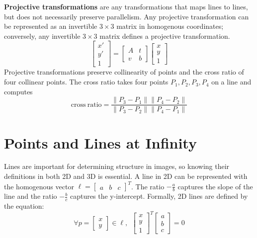 \documentclass[a4paper, 12pt]{article}
\renewcommand\emph{\textbf}
\begin{document}
\emph{Projective transformations} are any transformations that maps lines to lines, but does not necessarily preserve parallelism. Any projective transformation can be represented as an invertible $3\times 3$ matrix in homogenous coordinates; conversely, any invertible $3\times 3$ matrix defines a projective transformation.
\begin{equation*}
    \begin{bmatrix}x'\\y'\\1\end{bmatrix} = \begin{bmatrix}A & t\\ v & b\end{bmatrix}\begin{bmatrix}x\\y\\1\end{bmatrix}
\end{equation*}
Projective transformations preserve collinearity of points and the cross ratio of four collinear points. The cross ratio takes four points $P_1, P_2, P_3, P_4$ on a line and computes
\begin{equation}
    \mathrm{cross\ ratio} = \frac{\|P_3-P_1\|\|P_4-P_2\|}{\|P_3-P_2\|\|P_4-P_1\|}
\end{equation}

\section{Points and Lines at Infinity}
Lines are important for determining structure in images, so knowing their definitions in both 2D and 3D is essential. A line in 2D can be represented with the homogenous vector $\ell = \begin{bmatrix}a & b & c \end{bmatrix}^T$. The ratio $-\frac{a}{b}$ captures the slope of the line and the ratio $-\frac{b}{c}$ captures the y-intercept. Formally, 2D lines are defined by the equation:
\begin{equation}
\forall p = \begin{bmatrix}x\\y\end{bmatrix} \in \ell,\ \  \begin{bmatrix}x\\y\\1\end{bmatrix}^T\begin{bmatrix}a \\ b \\ c\end{bmatrix} = 0
\end{equation}
\end{document}
